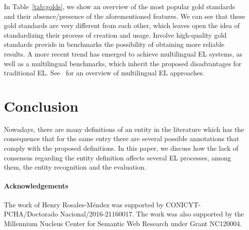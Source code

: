 \documentclass{llncs}
\begin{document}
In Table~\ref{tab:golds}, we show an overview of the most popular gold standards and their absence/presence of the aforementioned features. We can see that these gold standards are very different from each other, which leaves open the idea of standardizing their process of creation and usage. Involve high-quality gold standards provide in benchmarks the possibility of obtaining more reliable results. A more recent trend has emerged to achieve multilingual EL systems, as well as a multilingual benchmarks, which inherit the proposed disadvantages for traditional EL. See~\cite{LD4IE2017} for an overview of multilingual EL approaches.




\section{Conclusion}
\label{sec:conclusion}

Nowadays, there are many definitions of an entity in the literature which has the consequence that for the same entry there are several possible annotations that comply with the proposed definitions. In this paper, we discuss how the lack of consensus regarding the entity definition affects several EL processes, among them, the entity recognition and the evaluation. 

%



{\footnotesize
\paragraph{Acknowledgements} The work of Henry Rosales-M\'endez was supported by CONICYT-PCHA/Doctorado Nacional/2016-21160017. The work was also supported by the Millennium Nucleus Center for Semantic Web Research under Grant NC120004.}
\end{document}
